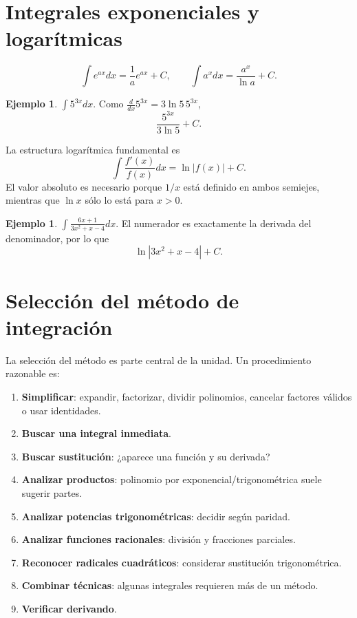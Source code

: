 \documentclass[12pt]{article}
\theoremstyle{definition}\newtheorem{definicion}[teorema]{Definición}\newtheorem{ejemplo}[teorema]{Ejemplo}\newtheorem{ejercicio}[teorema]{Ejercicio}
\theoremstyle{remark}\newtheorem*{observacion}{Observación}\newtheorem*{advertencia}{Advertencia}\newtheorem*{estrategia}{Estrategia}
\begin{document}
\section{Integrales exponenciales y logarítmicas}
\[\int e^{ax}dx=\frac1a e^{ax}+C,\qquad \int a^xdx=\frac{a^x}{\ln a}+C.\]
\begin{ejemplo}$\int 5^{3x}dx$. Como $\frac{d}{dx}5^{3x}=3\ln5\,5^{3x}$,
\[\boxed{\frac{5^{3x}}{3\ln5}+C}.\]\end{ejemplo}
La estructura logarítmica fundamental es
\[\boxed{\int\frac{f'(x)}{f(x)}dx=\ln|f(x)|+C}.\]
El valor absoluto es necesario porque $1/x$ está definido en ambos semiejes, mientras que $\ln x$ sólo lo está para $x>0$.
\begin{ejemplo}$\int\frac{6x+1}{3x^2+x-4}dx$. El numerador es exactamente la derivada del denominador, por lo que
\[\boxed{\ln|3x^2+x-4|+C}.\]\end{ejemplo}

\section{Selección del método de integración}
La selección del método es parte central de la unidad. Un procedimiento razonable es:
\begin{enumerate}
\item \textbf{Simplificar}: expandir, factorizar, dividir polinomios, cancelar factores válidos o usar identidades.
\item \textbf{Buscar una integral inmediata}.
\item \textbf{Buscar sustitución}: ¿aparece una función y su derivada?
\item \textbf{Analizar productos}: polinomio por exponencial/trigonométrica suele sugerir partes.
\item \textbf{Analizar potencias trigonométricas}: decidir según paridad.
\item \textbf{Analizar funciones racionales}: división y fracciones parciales.
\item \textbf{Reconocer radicales cuadráticos}: considerar sustitución trigonométrica.
\item \textbf{Combinar técnicas}: algunas integrales requieren más de un método.
\item \textbf{Verificar derivando}.
\end{enumerate}
\end{document}

